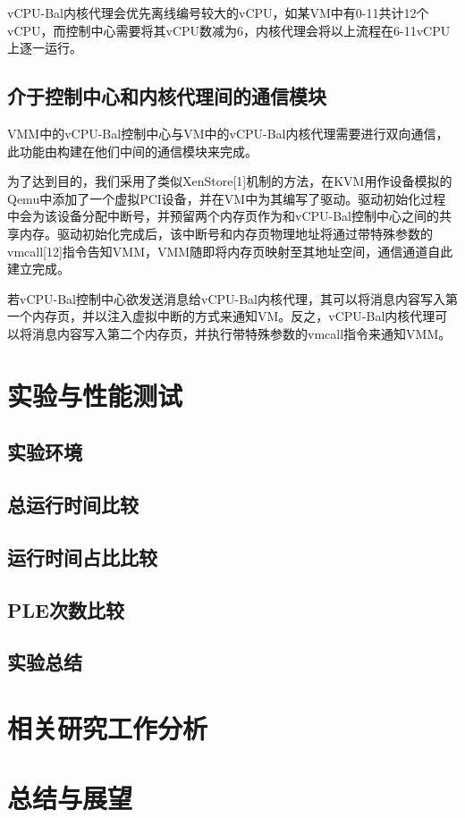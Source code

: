 vCPU-Bal内核代理会优先离线编号较大的vCPU，如某VM中有0-11共计12个vCPU，而控制中心需要将其vCPU数减为6，内核代理会将以上流程在6-11vCPU上逐一运行。

\subsection{介于控制中心和内核代理间的通信模块}

VMM中的vCPU-Bal控制中心与VM中的vCPU-Bal内核代理需要进行双向通信，此功能由构建在他们中间的通信模块来完成。

为了达到目的，我们采用了类似XenStore[1]机制的方法，在KVM用作设备模拟的Qemu中添加了一个虚拟PCI设备，并在VM中为其编写了驱动。驱动初始化过程中会为该设备分配中断号，并预留两个内存页作为和vCPU-Bal控制中心之间的共享内存。驱动初始化完成后，该中断号和内存页物理地址将通过带特殊参数的vmcall[12]指令告知VMM，VMM随即将内存页映射至其地址空间，通信通道自此建立完成。

若vCPU-Bal控制中心欲发送消息给vCPU-Bal内核代理，其可以将消息内容写入第一个内存页，并以注入虚拟中断的方式来通知VM。反之，vCPU-Bal内核代理可以将消息内容写入第二个内存页，并执行带特殊参数的vmcall指令来通知VMM。



\section{实验与性能测试}

\subsection{实验环境}

\subsection{总运行时间比较}

\subsection{运行时间占比比较}

\subsection{PLE次数比较}

\subsection{实验总结}



\section{相关研究工作分析}



\section{总结与展望}